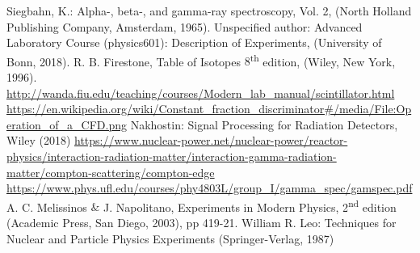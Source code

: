 \documentclass[twocolumn]{article}
\begin{document}
\begin{thebibliography}{9}

Siegbahn, K.: Alpha-, beta-, and gamma-ray spectroscopy, Vol. 2, (North Holland Publishing Company, Amsterdam, 1965).
Unspecified author: Advanced Laboratory Course (physics601): Description of Experiments, (University of Bonn, 2018).
R. B. Firestone, Table of Isotopes $8$\textsuperscript{th} edition, (Wiley, New York, 1996).
 \url{http://wanda.fiu.edu/teaching/courses/Modern_lab_manual/scintillator.html}
\url{https://en.wikipedia.org/wiki/Constant_fraction_discriminator#/media/File:Operation_of_a_CFD.png}
Nakhostin: Signal Processing for Radiation Detectors, Wiley (2018)
\url{https://www.nuclear-power.net/nuclear-power/reactor-physics/interaction-radiation-matter/interaction-gamma-radiation-matter/compton-scattering/compton-edge}
\url{https://www.phys.ufl.edu/courses/phy4803L/group_I/gamma_spec/gamspec.pdf}
A. C. Melissinos $\&$ J. Napolitano, Experiments in Modern Physics, 2\textsuperscript{nd} edition (Academic Press, San Diego, 2003), pp 419-21.
William R. Leo: Techniques for Nuclear and Particle Physics Experiments (Springer-Verlag, 1987)
\end{thebibliography}
\end{document}
